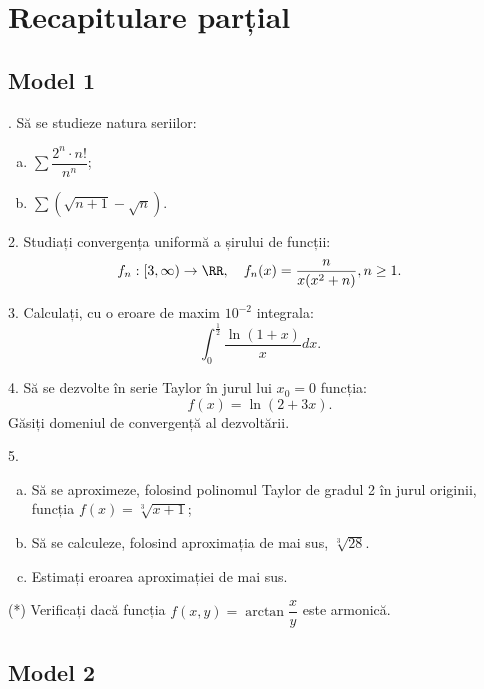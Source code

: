 \chapter{Recapitulare parțial}

\section{Model 1}

\indent{}. Să se studieze natura seriilor:
\begin{enumerate}[(a)]
\item $ \sum \dfrac{2^n \cdot n!}{n^n} $;
\item $ \sum (\sqrt{n + 1} - \sqrt{n}) $.
\end{enumerate}

\vspace{1cm}

2. Studiați convergența uniformă a șirului de funcții:
\[
  f_n : [3, \infty) \to \RR, \quad f_n(x) = \frac{n}{x(x^2 + n)}, n \geq 1.
\]

\vspace{1cm}

3. Calculați, cu o eroare de maxim $ 10^{-2} $ integrala:
\[
  \int_0^{\frac{1}{2}} \frac{\ln(1 + x)}{x} dx.
\]

\vspace{1cm}

4. Să se dezvolte în serie Taylor în jurul lui $ x_0 = 0 $ funcția:
\[
  f(x) = \ln(2 + 3x).
\]
Găsiți domeniul de convergență al dezvoltării.

\vspace{1cm}

5. \begin{enumerate}[(a)]
\item Să se aproximeze, folosind polinomul Taylor de gradul 2 în jurul
  originii, funcția $ f(x) = \sqrt[3]{x + 1} $;
\item Să se calculeze, folosind aproximația de mai sus, $ \sqrt[3]{28} $.
\item Estimați eroarea aproximației de mai sus.
\end{enumerate} 

\vspace{1cm}

(*) Verificați dacă funcția $ f(x, y) = \arctan \dfrac{x}{y} $ este
armonică.


\section{Model 2}

